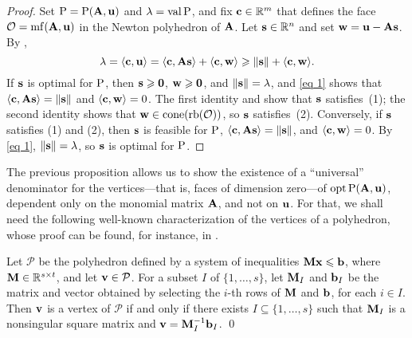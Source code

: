 \documentclass{article}
\begin{document}
\begin{proof}
   Set $\mathrm{P} = \mathrm{P}(\mathbf{A}, \mathbf{u})$ and $\lambda = \operatorname{val} \mathrm{P} $, and fix $\mathbf{c} \in \mathbb{R}^m$ that defines the face $\mathcal{O} = \operatorname{mf}(\mathbf{A}, \mathbf{u})$ in the Newton polyhedron of $\mathbf{A}$.
   Let $\mathbf{s} \in \mathbb{R}^n$ and set $\mathbf{w} = \mathbf{u} - \mathbf{A}\mathbf{s}$.
   By ,
   \begin{equation}\label{eq 1}
      \lambda = \langle \mathbf{c}, \mathbf{u} \rangle = \langle \mathbf{c}, \mathbf{A} \mathbf{s} \rangle + \langle \mathbf{c}, \mathbf{w} \rangle \geqslant \| \mathbf{s} \| + \langle \mathbf{c}, \mathbf{w} \rangle.
   \end{equation}
   If $\mathbf{s}$ is optimal for $\mathrm{P}$, then $\mathbf{s} \geqslant \mathbf{0}$, $\mathbf{w} \geqslant \mathbf{0}$, and $\| \mathbf{s} \| = \lambda$, and \eqref{eq 1} shows that $\langle \mathbf{c}, \mathbf{A} \mathbf{s} \rangle = \| \mathbf{s} \|$ and $\langle \mathbf{c}, \mathbf{w} \rangle = 0$.
   The first identity and  show that $\mathbf{s}$ satisfies~(1); the second identity shows that $\mathbf{w}\in \operatorname{cone}(\operatorname{rb}(\mathcal{O}))$, so $\mathbf{s}$ satisfies~(2).
   Conversely, if $\mathbf{s}$ satisfies (1) and (2), then $\mathbf{s}$ is feasible for $\mathrm{P}$, $\langle \mathbf{c}, \mathbf{A} \mathbf{s} \rangle = \| \mathbf{s} \|$, and $\langle \mathbf{c}, \mathbf{w} \rangle = 0$.
   By \eqref{eq 1}, $\| \mathbf{s} \| = \lambda$, so $\mathbf{s}$ is optimal for $\mathrm{P}$.
\end{proof}

The previous proposition allows us to show the existence of a ``universal'' denominator for the vertices---that is, faces of dimension zero---of $\operatorname{opt}\mathrm{P}(\mathbf{A},\mathbf{u})$, dependent only on the monomial matrix $\mathbf{A}$, and not on $\mathbf{u}$.
For that, we shall need the following well-known characterization of the vertices of a polyhedron, whose proof can be found, for instance, in \cite[Theorem~3.34]{conforti+etal.integer_programming}.

\begin{lemma}
   \label{prop: characterization of vertices}
   Let $\mathcal{P}$ be the polyhedron defined by a system of inequalities $\mathbf{M} \mathbf{x} \leqslant \mathbf{b}$, where $\mathbf{M}\in \mathbb{R}^{s\times t}$, and let $\mathbf{v} \in \mathcal{P}$.
   For a subset $I$ of $\{1,\ldots,s\}$, let $\mathbf{M}_I$ and $\mathbf{b}_I$ be the matrix and vector obtained by selecting the $i$-th rows of $\mathbf{M}$ and $\mathbf{b}$, for each $i\in I$.
   Then $\mathbf{v}$ is a vertex of $\mathcal{P}$ if and only if there exists $I \subseteq \{1,\ldots,s\}$ such that $\mathbf{M}_I$ is a nonsingular square matrix and $\mathbf{v} = \mathbf{M}_I^{-1}\mathbf{b}_I$.
\qed
\end{lemma}
\end{document}
